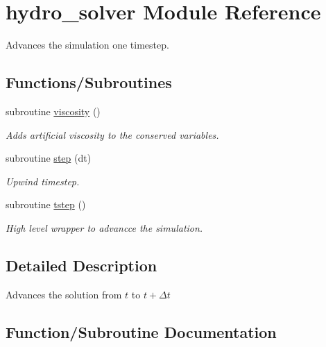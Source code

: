 \hypertarget{namespacehydro__solver}{}\section{hydro\+\_\+solver Module Reference}
\label{namespacehydro__solver}


Advances the simulation one timestep.  


\subsection*{Functions/\+Subroutines}
\begin{DoxyCompactItemize}
\item 
subroutine \hyperlink{namespacehydro__solver_a88127baf969063d6d9a31845fa7c1835}{viscosity} ()
\begin{DoxyCompactList}\small\item\em Adds artificial viscosity to the conserved variables. \end{DoxyCompactList}\item 
subroutine \hyperlink{namespacehydro__solver_ac34a166e9ddd81f20f2b271138458a1a}{step} (dt)
\begin{DoxyCompactList}\small\item\em Upwind timestep. \end{DoxyCompactList}\item 
subroutine \hyperlink{namespacehydro__solver_aa95013d45fe4922819805e68527ab3b5}{tstep} ()
\begin{DoxyCompactList}\small\item\em High level wrapper to advancce the simulation. \end{DoxyCompactList}\end{DoxyCompactItemize}


\subsection{Detailed Description}
Advances the solution from $ t $ to $ t + \Delta t $ 

\subsection{Function/\+Subroutine Documentation}
\hypertarget{namespacehydro__solver_ac34a166e9ddd81f20f2b271138458a1a}{}
